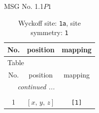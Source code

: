 \documentclass[fleqn,8pt]{jsarticle}
\begin{document}
\setcounter{MaxMatrixCols}{32}

\renewcommand{\tablename}{Table~}
\renewcommand{\figurename}{Figure~}
\begin{center}
\LARGE
MSG No. 1.1\quad$P1$
\end{center}
\renewcommand{\arraystretch}{1.2}
\begin{longtable}{ccc}
\caption{Wyckoff site: {\tt 1a}, site symmetry: {\tt 1}}
 \\
 \hline \hline
No. & position & mapping \\ \hline \endfirsthead

\multicolumn{2}{l}{\tablename\ \thetable{}} \\
 \hline \hline
No. & position & mapping \\ \hline \endhead

 \hline \hline
\multicolumn{2}{r}{\footnotesize\it continued ...} \\ \endfoot

 \hline \hline
\multicolumn{2}{r}{} \\ \endlastfoot

1 & $\left[ x,\, y,\, z \right]$ & {\tt [1]} \\
\end{longtable}
\end{document}
